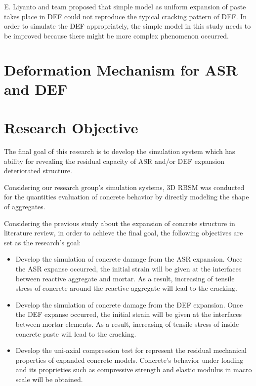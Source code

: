 \begin{itemize}
    E. Liyanto and team proposed that simple model as uniform expansion of paste takes place in DEF could not reproduce the typical cracking pattern of DEF. In order to simulate the DEF appropriately, the simple model in this study needs to be improved because there might be more complex phenomenon occurred.

\end{itemize}


\section{Deformation Mechanism for ASR and DEF}


\section{Research Objective}

The final goal of this research is to develop the simulation system which has ability for revealing the residual capacity of ASR and/or DEF expansion deteriorated structure.

Considering our research group’s simulation systems, 3D RBSM was conducted for the quantities evaluation of concrete behavior by directly modeling the shape of aggregates.

Considering the previous study about the expansion of concrete structure in literature review, in order to achieve the final goal, the following objectives are set as the research’s goal:

\begin{itemize}

    \item Develop the simulation of concrete damage from the ASR expansion. Once the ASR expanse occurred, the initial strain will be given at the interfaces between reactive aggregate and mortar. As a result, increasing of tensile stress of concrete around the reactive aggregate will lead to the cracking.

    \item Develop the simulation of concrete damage from the DEF expansion. Once the DEF expanse occurred, the initial strain will be given at the interfaces between mortar elements. As a result, increasing of tensile stress of inside concrete paste will lead to the cracking.

    \item Develop the uni-axial compression test for represent the residual mechanical properties of expanded concrete models. Concrete's behavior under loading and its proprieties such as compressive strength and elastic modulus in macro scale will be obtained.

\end{itemize}



